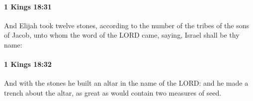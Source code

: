 		\paragraph{1 Kings 18:31} %
			\label{1KINGS-18-31}

			And Elijah took twelve stones, according to the number of the tribes of the sons of Jacob, unto whom the word of the LORD came, saying, Israel shall be thy name:


		\paragraph{1 Kings 18:32} %
			\label{1KINGS-18-32}

			And with the stones he built an altar in the name of the LORD: and he made a trench about the altar, as great as would contain two measures of seed.


